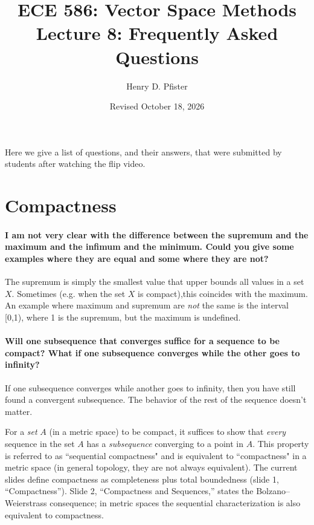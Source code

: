 \documentclass[10pt,english]{article}
\begin{document}
\title{ECE 586: Vector Space Methods \\ Lecture 8: Frequently Asked Questions}
\author{Henry D. Pfister \\ \univ}
\date{Revised October 18, 2026}

\maketitle

Here we give a list of questions, and their answers, that were submitted by students after watching the flip video.

\section{Compactness}

\paragraph{I am not very clear with the difference between the supremum and the maximum and the infimum and the minimum. Could you give some examples where they are equal and some where they are not?}
The supremum is simply the smallest value that upper bounds all values in a set $X$. Sometimes (e.g. when the set $X$ is compact),this coincides with the maximum. An example where maximum and supremum are \textit{not} the same is the interval [0,1), where 1 is the supremum, but the maximum is undefined.


\paragraph{Will one subsequence that converges suffice for a sequence to be compact? What if one subsequence converges while the other goes to infinity?}
If one subsequence converges while another goes to infinity, then you have still found a convergent subsequence.
The behavior of the rest of the sequence doesn't matter.

For a \textit{set} $A$ (in a metric space) to be compact, it suffices to show that \textit{every} sequence in the set $A$ has a \textit{subsequence} converging to a point in $A$.
This property is referred to as ``sequential compactness" and is equivalent to ``compactness" in a metric space (in general topology, they are not always equivalent).
The current slides define compactness as completeness plus total boundedness (slide 1, ``Compactness''). Slide 2, ``Compactness and Sequences,'' states the Bolzano--Weierstrass consequence; in metric spaces the sequential characterization is also equivalent to compactness.
\end{document}
